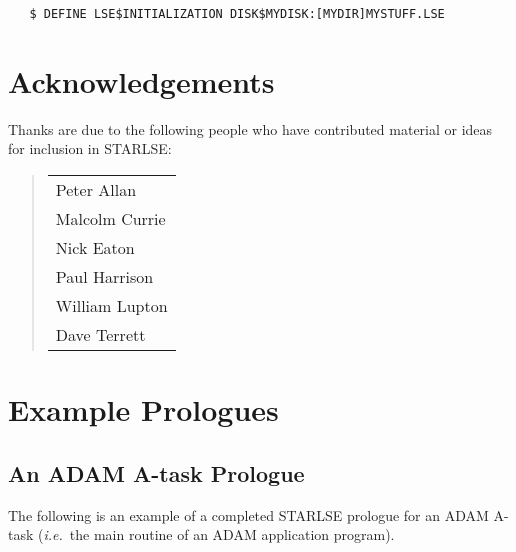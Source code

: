 \begin{verbatim}
   $ DEFINE LSE$INITIALIZATION DISK$MYDISK:[MYDIR]MYSTUFF.LSE
\end{verbatim}


\section{Acknowledgements}

Thanks are due to the following people who have contributed material or 
ideas for inclusion in \mbox{STARLSE}:

\begin{quote}
\begin{tabular}{l}
Peter Allan \\
Malcolm Currie \\
Nick Eaton \\
Paul Harrison \\
William Lupton \\
Dave Terrett
\end{tabular}
\end{quote}

\newpage
\appendix

\section{Example Prologues}
\label{section:prologues}

\subsection{An ADAM A-task Prologue}

The following is an example of a completed STARLSE prologue for an ADAM 
A-task ({\em i.e.}\ the main routine of an ADAM application program).

